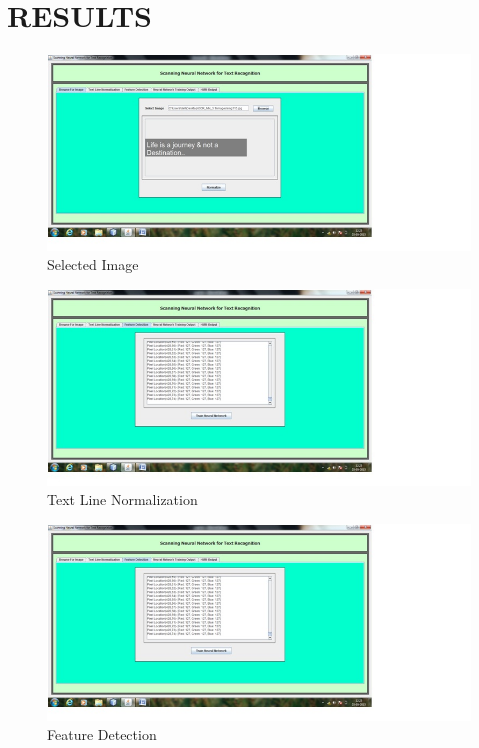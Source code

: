 \chapter{RESULTS}
\begin{figure}[h]
\begin{center}
\includegraphics[scale=0.5]{op1.jpg}
\end{center}
\caption{Selected Image}
\end{figure}


\begin{figure}[h]
\begin{center}
\includegraphics[scale=0.5]{op2.jpg}
\end{center}
\caption{Text Line Normalization}
\end{figure}


\begin{figure}[h]
\begin{center}
\includegraphics[scale=0.5]{op3.jpg}
\end{center}
\caption{Feature Detection}
\end{figure}


